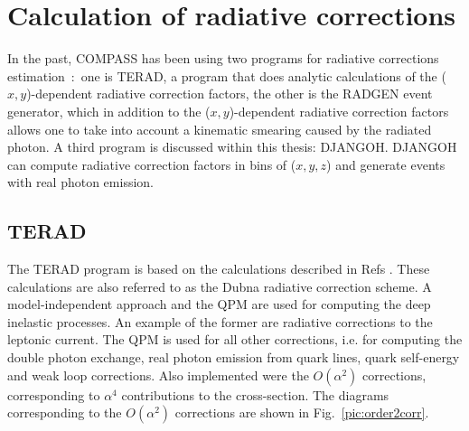 
\chapter{Calculation of radiative corrections} %

\label{ch:Calculation} %


In the past, COMPASS has been using two programs for radiative corrections estimation~:~one is TERAD, a program that does analytic calculations of the ($x,y$)-dependent radiative correction factors, the other is the RADGEN event generator, which in addition to the ($x,y$)-dependent radiative correction factors allows one to take into account a kinematic smearing caused by the radiated photon. A third program is discussed within this thesis: DJANGOH. DJANGOH can compute radiative correction factors in bins of ($x,y,z$) and generate events with real photon emission.

\section{TERAD}

The TERAD program is based on the calculations described in Refs \cite{TERAD1,TERAD2,TERAD3}. These calculations are also referred to as the Dubna radiative correction scheme. A model-independent approach and the QPM are used for computing the deep inelastic processes. An example of the former are radiative corrections to the leptonic current. The QPM is used for all other corrections, i.e. for computing the double photon exchange, real photon emission from quark lines, quark self-energy and weak loop corrections. Also implemented were the $O(\alpha^2)$ corrections, corresponding to $\alpha^4$ contributions to the cross-section. The diagrams corresponding to the $O(\alpha^2)$ corrections are shown in Fig.~\ref{pic:order2corr}.


